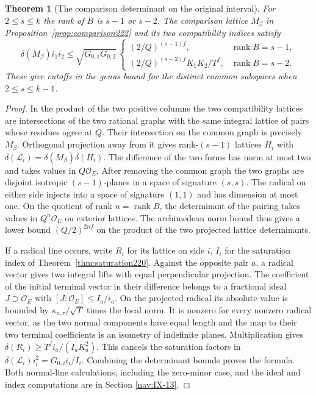 \documentclass[a4paper,11pt]{article}
\newtheorem{theorem}[proposition]{Theorem}
\theoremstyle{definition}
\theoremstyle{remark}
\numberwithin{equation}{section}
\begin{document}
\begin{theorem}[The comparison determinant on the original interval]
\label{thm:cutoff224}
For \(2\le s\le k\) the rank of \(B\) is \(s-1\) or \(s-2\).
The comparison lattice \(M_\beta\) in Proposition~\ref{prop:comparison222}
and its two compatibility indices satisfy
\[
 \delta(M_\beta)i_1i_2\le \sqrt{G_{0,1}G_{0,2}}\,
 \begin{cases}
    (2/Q)^{(s-1)f}, & \operatorname{rank}B=s-1,\\
    (2/Q)^{(s-2)f}K_1K_2/T^f, &\operatorname{rank}B=s-2 .
 \end{cases}
\]
These give cutoffs in the genus bound for the distinct
common subspaces when \(2\le s\le k-1\).
\end{theorem}
\begin{proof}
In the product of the two positive columns the two
compatibility lattices are intersections of the two rational
graphs with the same integral lattice of pairs whose
residues agree at \(Q\). Their intersection on the common
graph is precisely \(M_\beta\). Orthogonal projection away
from it gives rank-\((s-1)\) lattices \(H_i\) with
\(\delta(\mathcal L_i)=\delta(M_\beta)\delta(H_i)\).
The difference of the two forms has norm at most two and
takes values in \(Q\mathcal O_E\). After removing the common
graph the two graphs are disjoint isotropic \((s-1)\)-planes in a space
of signature \((s,s)\). The radical on either side injects
into a space of signature \((1,1)\) and has dimension at most
one. On the quotient of rank \(n=\operatorname{rank}B\), the
determinant of the pairing takes values in \(Q^n\mathcal O_E\)
on exterior lattices. The archimedean norm bound thus gives
a lower bound \((Q/2)^{2nf}\) on the product of the two
projected lattice determinants.

If a radical line occurs, write \(R_i\) for its lattice on
side \(i\), \(I_i\) for the saturation index of
Theorem~\ref{thm:saturation220}. Against the opposite pair
\(a\), a radical vector gives two integral lifts with equal
perpendicular projection. The coefficient of the initial
terminal vector in their difference belongs to a fractional
ideal \(J\supset\mathcal O_E\) with
\([J:\mathcal O_E]\le I_a/i_a\). On the projected radical
its absolute value is
bounded by \(\kappa_{a,\tau}/\sqrt T\) times the local norm.
It is nonzero for every nonzero radical vector, as the two
normal components have equal length and the map to their
two terminal coefficients is an isometry of indefinite
planes. Multiplication gives
\(\delta(R_i)\ge T^f i_a/(I_aK_a^2)\). This cancels the
saturation factors in
\(\delta(\mathcal L_i)i_i^2=G_{0,i} i_i/I_i\).
Combining the determinant bounds proves the formula. Both
normal-line calculations, including the zero-minor case,
and the ideal and index computations are in
Section \ref{nav:IX-13}.
\end{proof}
\end{document}
